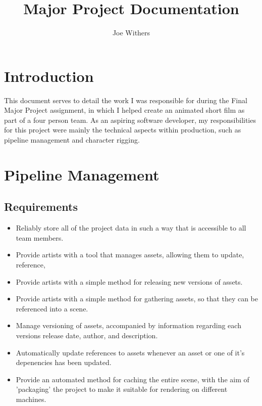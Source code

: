 \documentclass[11pt]{article}
\title{\textbf{Major Project Documentation}}
\author{Joe Withers}
\date{}
\begin{document}
\maketitle

\tableofcontents
\newpage

\section{Introduction}

This document serves to detail the work I was responsible for during the Final Major Project assignment, in which I helped create an animated short film as part of a four person team.
As an aspiring software developer, my responsibilities for this project were mainly the technical aspects within production, such as pipeline management and character rigging.

\section{Pipeline Management}

\subsection{Requirements}

\begin{itemize}

\item Reliably store all of the project data in such a way that is accessible to all team members.

\item Provide artists with a tool that manages assets, allowing them to update, reference,

\item Provide artists with a simple method for releasing new versions of assets.

\item Provide artists with a simple method for gathering assets, so that they can be referenced into a scene.

\item Manage versioning of assets, accompanied by information regarding each versions release date, author, and  description.

\item Automatically update references to assets whenever an asset or one of it's depenencies has been updated.

\item Provide an automated method for caching the entire scene, with the aim of 'packaging' the project to make it suitable for rendering on different machines.

\end{itemize}
\end{document}
